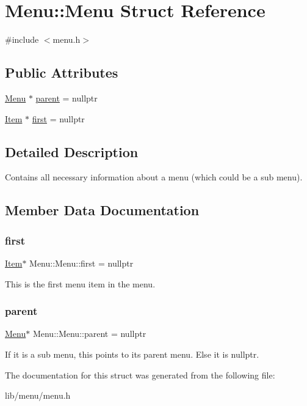 \hypertarget{struct_menu_1_1_menu}{}\section{Menu\+:\+:Menu Struct Reference}
\label{struct_menu_1_1_menu}


{\ttfamily \#include $<$menu.\+h$>$}

\subsection*{Public Attributes}
\begin{DoxyCompactItemize}
\item 
\hyperlink{struct_menu_1_1_menu}{Menu} $\ast$ \hyperlink{struct_menu_1_1_menu_accedb5340f42f80cf0876b4d1e4df512}{parent} = nullptr
\item 
\hyperlink{struct_menu_1_1_item}{Item} $\ast$ \hyperlink{struct_menu_1_1_menu_aa9cb1f287490ac21ebac38e997c21af0}{first} = nullptr
\end{DoxyCompactItemize}


\subsection{Detailed Description}
Contains all necessary information about a menu (which could be a sub menu). 

\subsection{Member Data Documentation}
\hypertarget{struct_menu_1_1_menu_aa9cb1f287490ac21ebac38e997c21af0}{}\label{struct_menu_1_1_menu_aa9cb1f287490ac21ebac38e997c21af0} 
\subsubsection{\texorpdfstring{first}{first}}
{\footnotesize\ttfamily \hyperlink{struct_menu_1_1_item}{Item}$\ast$ Menu\+::\+Menu\+::first = nullptr}

This is the first menu item in the menu. \hypertarget{struct_menu_1_1_menu_accedb5340f42f80cf0876b4d1e4df512}{}\label{struct_menu_1_1_menu_accedb5340f42f80cf0876b4d1e4df512} 
\subsubsection{\texorpdfstring{parent}{parent}}
{\footnotesize\ttfamily \hyperlink{struct_menu_1_1_menu}{Menu}$\ast$ Menu\+::\+Menu\+::parent = nullptr}

If it is a sub menu, this points to its parent menu. Else it is nullptr. 

The documentation for this struct was generated from the following file\+:\begin{DoxyCompactItemize}
\item 
lib/menu/menu.\+h\end{DoxyCompactItemize}
